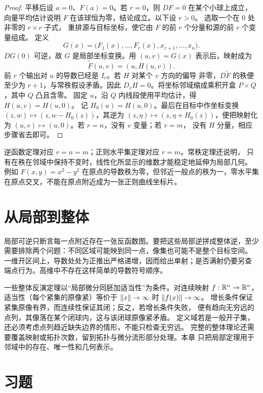 \begin{proof}
平移后设 $a=0$、$F(a)=0$。若 \(r=0\)，则 \(DF=0\) 在某个小球上成立，
向量平均估计说明 \(F\) 在该球恒为零，结论成立。以下设 \(r>0\)。
选取一个在 $0$ 处非零的 $r\times r$ 子式，
重排源与目标坐标，使它由 $F$ 的前 $r$ 个分量和源的前 $r$ 个变量组成。
定义
\[
 G(x)=\bigl(F_1(x),\ldots,F_r(x),x_{r+1},\ldots,x_n\bigr).
\]
$DG(0)$ 可逆，故 $G$ 是局部坐标变换。用 $(u,v)=G(x)$ 表示后，映射成为
\[
 \widetilde F(u,v)=(u,H(u,v)).
\]
前 $r$ 个输出对 $u$ 的导数已经是 $I_r$。若 $H$ 对某个 $v$ 方向的偏导
非零，$D\widetilde F$ 的秩便至少为 $r+1$，与常秩假设矛盾。因此
$D_vH=0$。将坐标邻域缩成乘积开盒 \(P\times Q\)，其中 \(Q\) 凸且含零。
固定 \(u\)，沿 \(Q\) 内线段使用平均估计，得 \(H(u,v)=H(u,0)\)。
记 \(H_0(u)=H(u,0)\)。最后在目标中作坐标变换
\((z,w)\mapsto(z,w-H_0(z))\)，其逆为
\((z,\eta)\mapsto(z,\eta+H_0(z))\)，便把映射化为
\((u,v)\mapsto(u,0)\)。若 \(r=n\)，没有 \(v\) 变量；若 \(r=m\)，
没有 \(H\) 分量，相应步骤省去即可。
\end{proof}

逆函数定理对应 $r=n=m$；正则水平集定理对应 $r=m$。常秩定理还说明，
只有在秩在邻域中保持不变时，线性化所显示的维数才能稳定地延伸为局部几何。
例如 $F(x,y)=x^2-y^2$ 在原点的导数秩为零，但邻近一般点的秩为一，零水平集
在原点交叉，不能在原点附近成为一张正则曲线坐标片。

\section{从局部到整体}

局部可逆只断言每一点附近存在一张反函数图。要把这些局部逆拼成整体逆，至少
需要排除两个问题：不同区域可能映到同一点，像集也可能不是整个目标空间。
一维开区间上，导数处处为正推出严格递增，因而给出单射；是否满射仍要另查
端点行为。高维中不存在这样简单的导数符号顺序。

一些整体反演定理以“局部微分同胚加适当性”为条件。对连续映射
\(f:\mathbb{R}^n\to\mathbb{R}^n\)，适当性（每个紧集的原像紧）等价于
$\left\lVert x\right\rVert\to\infty$ 时 $\left\lVert f(x)\right\rVert\to\infty$。
增长条件保证紧集原像有界，而连续性保证其闭；反之，若增长条件失败，
便有趋向无穷远的点列，其像落在某个闭球内，这与该闭球原像紧矛盾。
定义域若是一般开子集，还必须考虑点列趋近缺失边界的情形，不能只检查无穷远。
完整的整体理论还需要覆盖映射或拓扑次数，留到拓扑与微分流形部分处理。本章
只把局部定理用于邻域中的存在、唯一性和几何表示。

\section*{习题}


